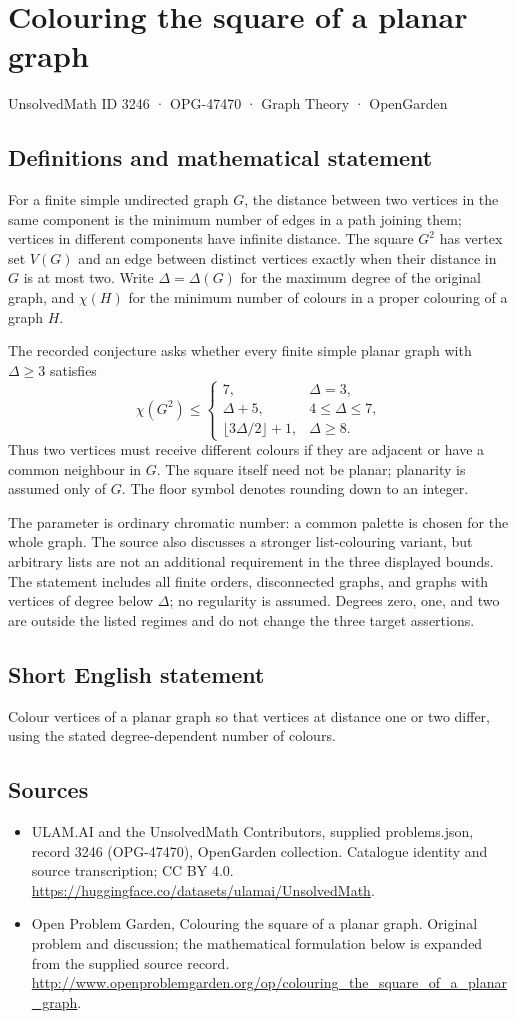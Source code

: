 \documentclass[11pt,a4paper]{article}
\begin{document}
\section*{Colouring the square of a planar graph}\label{3246}
{\small UnsolvedMath ID 3246 · OPG-47470 · Graph Theory · OpenGarden}
\subsection{Definitions and mathematical statement}
For a finite simple undirected graph $G$, the distance between two vertices
in the same component is the minimum number of edges in a path joining
them; vertices in different components have infinite distance. The square
$G^2$ has vertex set $V(G)$ and an edge between distinct vertices exactly
when their distance in $G$ is at most two. Write $\Delta=\Delta(G)$ for
the maximum degree of the original graph, and $\chi(H)$ for the minimum
number of colours in a proper colouring of a graph $H$.

The recorded conjecture asks whether every finite simple planar graph
with $\Delta\ge3$ satisfies
\[
 \chi(G^2)\le
 \begin{cases}
  7,&\Delta=3,\\
  \Delta+5,&4\le\Delta\le7,\\
  \lfloor3\Delta/2\rfloor+1,&\Delta\ge8.
 \end{cases}
\]
Thus two vertices must receive different colours if they are adjacent
or have a common neighbour in $G$. The square itself need not be planar;
planarity is assumed only of $G$. The floor symbol denotes rounding down
to an integer.

The parameter is ordinary chromatic number: a common palette is chosen
for the whole graph. The source also discusses a stronger list-colouring
variant, but arbitrary lists are not an additional requirement in the
three displayed bounds. The statement includes all finite orders,
disconnected graphs, and graphs with vertices of degree below $\Delta$;
no regularity is assumed. Degrees zero, one, and two are outside the
listed regimes and do not change the three target assertions.
\subsection{Short English statement}
Colour vertices of a planar graph so that vertices at distance one or two differ, using the stated degree-dependent number of colours.
\subsection{Sources}
\begin{itemize}
\item[S1] ULAM.AI and the UnsolvedMath Contributors, supplied problems.json, record 3246 (OPG-47470), OpenGarden collection. Catalogue identity and source transcription; CC BY 4.0.
\url{https://huggingface.co/datasets/ulamai/UnsolvedMath}.
\item[S2] Open Problem Garden, Colouring the square of a planar graph. Original problem and discussion; the mathematical formulation below is expanded from the supplied source record.
\url{http://www.openproblemgarden.org/op/colouring_the_square_of_a_planar_graph}.
\end{itemize}
\end{document}
